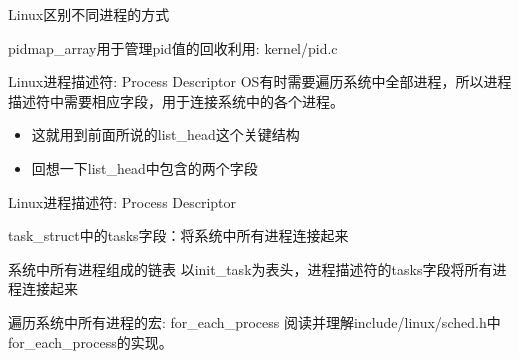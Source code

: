 \documentclass[xcolor=svgnames]{beamer}
\begin{document}
\begin{CJK*}{UTF8}{gbsn}
\begin{frame}{Linux区别不同进程的方式}
\begin{block}{pidmap\_array用于管理pid值的回收利用: kernel/pid.c}
\lstpidmaparray
\end{block}
\end{frame}


\begin{frame}{Linux进程描述符: Process Descriptor}
OS有时需要遍历系统中全部进程，所以进程描述符中需要相应字段，用于连接系统中的各个进程。
\begin{itemize}
\item 这就用到前面所说的list\_head这个关键结构
\item 回想一下list\_head中包含的两个字段
\end{itemize}
\end{frame}

\begin{frame}{Linux进程描述符: Process Descriptor}
\begin{block}{task\_struct中的tasks字段：将系统中所有进程连接起来} 
\lsttasks
\end{block}
\begin{block}{系统中所有进程组成的链表}
以init\_task为表头，进程描述符的tasks字段将所有进程连接起来
\end{block}
\begin{block}{遍历系统中所有进程的宏: for\_each\_process}
阅读并理解include/linux/sched.h中for\_each\_process的实现。
\end{block}
\end{frame}


\end{CJK*}
\end{document}
